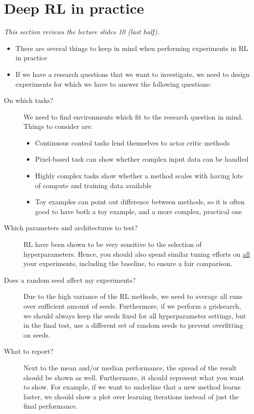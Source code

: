 \section{Deep RL in practice}
\textit{This section reviews the lecture slides 10 (last half).}
\begin{itemize}
	\item There are several things to keep in mind when performing experiments in RL in practice
	\item If we have a research questions that we want to investigate, we need to design experiments for which we have to answer the following questions:
\end{itemize}
\begin{description}
	\item[On which tasks?] We need to find environments which fit to the research question in mind. Things to consider are:
	\begin{itemize}
		\item Continuous control tasks lend themselves to actor critic methods
		\item Pixel-based task can show whether complex input data can be handled
		\item Highly complex tasks show whether a method scales with having lots of compute and training data available
		\item Toy examples can point out difference between methods, so it is often good to have both a toy example, and a more complex, practical one
	\end{itemize}
	\item[Which parameters and architectures to test?] RL have been shown to be very sensitive to the selection of hyperparameters. Hence, you should also spend similar tuning efforts on \underline{all} your experiments, including the baseline, to ensure a fair comparison.
	\item[Does a random seed affect my experiments?] Due to the high variance of the RL methods, we need to average all runs over sufficient amount of seeds. Furthermore, if we perform a gridsearch, we should always keep the seeds fixed for all hyperparameter settings, but in the final test, use a different set of random seeds to prevent overfitting on seeds.
	\item[What to report?] Next to the mean and/or median performance, the spread of the result should be shown as well. Furthermore, it should represent what you want to show. For example, if we want to underline that a new method learns faster, we should show a plot over learning iterations instead of just the final performance.
\end{description}
